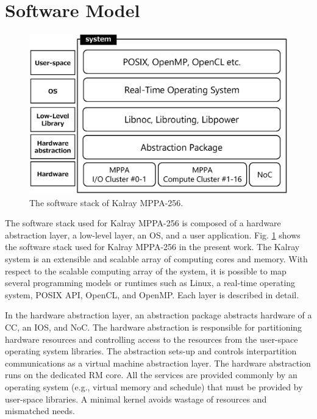 \section{Software Model}
\label{sec:software_model}

\begin{figure}[!htbp]
  \centering
  \includegraphics[width=0.7\linewidth]{../figure/softwarestack.eps}   
  \caption{\label{fig:software_stack}
    The software stack of Kalray MPPA-256.}     
\end{figure}

The software stack used for Kalray MPPA-256 is composed of a hardware abstraction layer, a low-level layer, an OS, and a user application.  
Fig. \ref{fig:software_stack} shows the software stack used for Kalray MPPA-256 in the present work.
The Kalray system is an extensible and scalable array of computing cores and memory.
With respect to the scalable computing array of the system, it is possible to map several programming models or runtimes such as Linux, a real-time operating system, POSIX API, OpenCL, and OpenMP.
Each layer is described in detail.

In the hardware abstraction layer, an abstraction package abstracts hardware of a CC, an IOS, and NoC.
The hardware abstraction is responsible for partitioning hardware resources and controlling access to the resources from the user-space operating system libraries.
The abstraction sets-up and controls interpartition communications as a virtual machine abstraction layer.
The hardware abstraction runs on the dedicated RM core.
All the services are provided commonly by an operating system (e.g., virtual memory and schedule) that must be provided by user-space libraries.
A minimal kernel avoids wastage of resources and mismatched needs.


